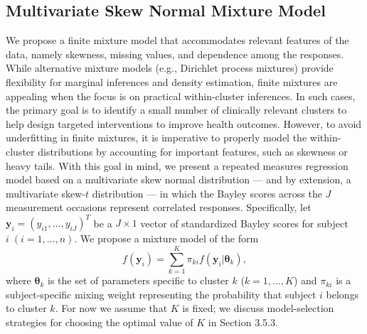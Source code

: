 \documentclass[useAMS,usenatbib,referee]{biom}
\begin{document}
\subsection{Multivariate Skew Normal Mixture Model}
We propose a finite mixture model that accommodates relevant features of the data, namely skewness, missing values, and dependence among the responses. While alternative mixture models (e.g., Dirichlet process mixtures) provide flexibility for marginal inferences and density estimation, finite mixtures are appealing when the focus is on practical within-cluster inferences. In such cases, the primary goal is to identify a small number of clinically relevant clusters to help design targeted interventions to improve health outcomes. However, to avoid underfitting in finite mixtures, it is imperative to properly model the within-cluster distributions by accounting for important features, such as skewness or heavy tails. With this goal in mind, we present a repeated measures regression model based on a multivariate skew normal distribution --- and by extension, a multivariate skew-$t$ distribution  --- in which the Bayley scores across the $J$ measurement occasions represent correlated responses. Specifically, let $\mathbf{y}_{i}=(y_{i1},\ldots,y_{iJ})^T$ be a $J \times 1$ vector of standardized Bayley scores for subject $i\;(i=1,\ldots,n)$. We propose a mixture model of the form
\begin{equation}
	\label{eq:mixture}
f(\mathbf{y}_i) = \sum_{k = 1}^{K} \pi_{ki} f(\mathbf{y}_i|\boldsymbol\theta_k),
\end{equation}
where $\boldsymbol\theta_k$ is the set of parameters specific to cluster $k$ ($k = 1,...,K$) and $\pi_{ki}$ is a subject-specific mixing weight representing the probability that subject $i$ belongs to cluster $k$. For now we assume that $K$ is fixed; we discuss model-selection strategies for choosing the optimal value of $K$ in Section 3.5.3.
\end{document}
